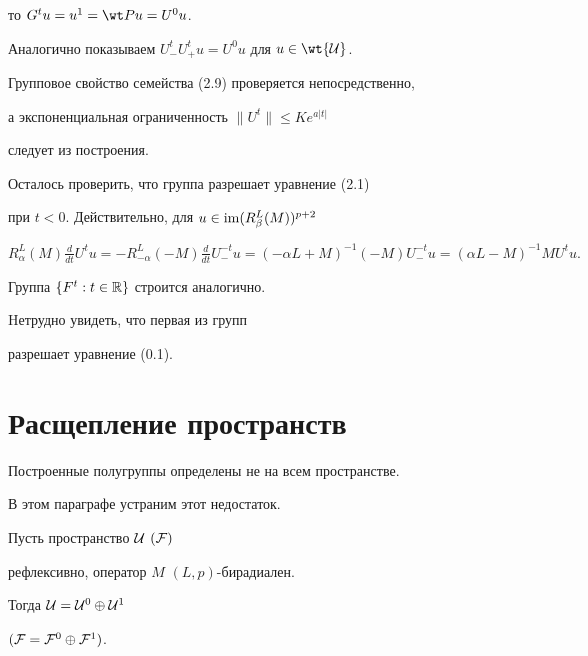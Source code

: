 \begin{pf}
то $G^tu=u^1=\wt Pu=U^0u$.





Аналогично показываем $U^t_-U^t_+u=U^0u$ для $u\in\wt {\cal U}$.


Групповое свойство семейства (2.9) проверяется непосредственно,


а экспоненциальная ограниченность $\| U^t\|\le Ke^{a|t|}$


следует из построения.


Осталось проверить, что группа разрешает уравнение (2.1)


при $t<0$. Действительно, для   $u\in\operatorname{im} (R_{\beta}^L(M))^{p+2}$\;


$R_{\alpha}^L(M)\frac{d}{dt}U^tu=


-R_{-\alpha}^L(-M)\frac{d}{dt}U^{-t}_-u=


(-\alpha L+M)^{-1}(-M)U^{-t}_-u=(\alpha L-M)^{-1}MU^tu.$





Группа $\{ F^t:t\in {\Bbb R}\}$ строится аналогично.


\end{pf}





\begin{notes}


Hетрудно увидеть, что первая из групп


разрешает  уравнение (0.1).


\end{notes}





\section{Расщепление пространств}





Построенные полугруппы определены не на всем пространстве.


В этом параграфе устраним этот недостаток.





\begin{thms}


Пусть пространство ${\cal U}$ $({\cal F})$


рефлексивно, оператор $M$\; $(L,p)$-бирадиален.


Тогда ${\cal U}={\cal U}^0\oplus {\cal U}^1$


$({\cal F}={\cal F}^0\oplus {\cal F}^1)$.


\end{thms}





